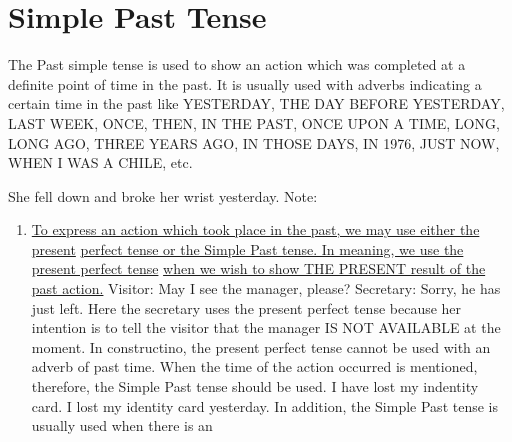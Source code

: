 \newpage
\section{Simple Past Tense}
The Past simple tense is used to show an action which was completed at a
definite point of time in the past.
It is usually used with adverbs indicating a certain time in the past like
YESTERDAY, THE DAY BEFORE YESTERDAY, LAST WEEK, ONCE, THEN, IN THE PAST, ONCE
UPON A TIME, LONG, LONG AGO, THREE YEARS AGO, IN THOSE DAYS, IN 1976, JUST NOW,
WHEN I WAS A CHILE, etc.

She fell down and broke her wrist yesterday.
\newline
Note:
\begin{enumerate}
    \item \underline{To express an action which took place in the past, we may
        use either the present}
        \newline
        \underline{perfect tense or the Simple Past tense. In meaning, we use
        the present perfect tense}
        \newline
        \underline{when we wish to show THE PRESENT result of the past action.}
        \newline
        \newline
        Visitor: May I see the manager, please?
        \newline
        \newline
        Secretary: Sorry, he has just left.
        \newline
        \newline
        Here the secretary uses the present perfect tense because her intention
        is to tell the visitor that the manager IS NOT AVAILABLE at the moment.
        \newline
        \newline
        In constructino, the present perfect tense cannot be used with an adverb
        of past time.
        When the time of the action occurred is mentioned, therefore, the Simple
        Past tense should be used.
        \newline
        \newline
        I have lost my indentity card.
        \newline
        \newline
        I lost my identity card yesterday.
        \newline
        \newline
        In addition, the Simple Past tense is usually used when there is an

\end{enumerate}
